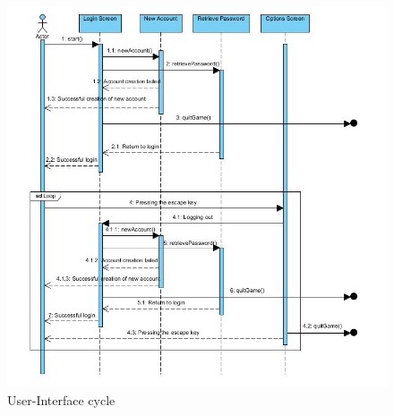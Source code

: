 \documentclass[letterpaper]{article}
\begin{document}
					\begin{figure}[H]
					\centering
					\includegraphics[width=180mm]{UML_Diagram/Sequence/GUI_Screens.jpg}
					\caption{User-Interface cycle}
					\label{overflow}
					\end{figure}
\end{document}
